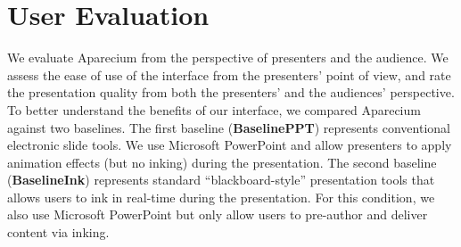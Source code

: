 \section{User Evaluation}

We evaluate Aparecium from the perspective of presenters and the audience. We assess the ease of use of the interface from the presenters' point of view, and rate the presentation quality from both the presenters' and the audiences' perspective.\\

To better understand the benefits of our interface, we compared Aparecium against two baselines. The first baseline (\textbf{BaselinePPT}) represents conventional electronic slide tools.
%
We use Microsoft PowerPoint and allow presenters to apply animation effects (but no inking) during the presentation.
%
The second baseline (\textbf{BaselineInk}) represents standard ``blackboard-style'' presentation tools that allows users to ink in real-time during the presentation.
%
For this condition, we also use Microsoft PowerPoint but only allow users to pre-author and deliver content via inking.\\

